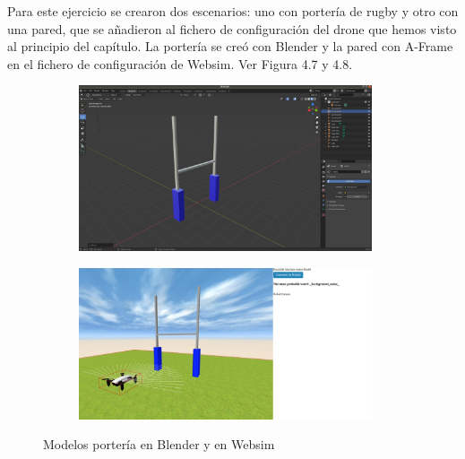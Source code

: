 Para este ejercicio se crearon dos escenarios: uno con portería de rugby y otro con una pared, que se añadieron al  fichero de configuración del drone que hemos visto al principio del capítulo. La portería se creó con Blender y la pared con A-Frame en el fichero de configuración de Websim. Ver Figura 4.7 y 4.8.

 \begin{figure}[H]
  \begin{subfigure}[b]{0.5\textwidth}
  \centering
    \includegraphics[width=0.95\textwidth, height=0.7\textwidth]{chapters/images/porteriablender.png}
    \caption{}
    \label{fig:f1}
  \end{subfigure}
  \hfill
  \begin{subfigure}[b]{0.5\textwidth}
  \centering
    \includegraphics[width=0.95\textwidth, height=0.7\textwidth]{chapters/images/porteriawebsim.png}
	\caption{}    
    \label{fig:f2}
 
  \end{subfigure}
  \caption{Modelos portería en Blender y  en Websim }
\end{figure}


